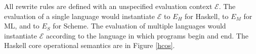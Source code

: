 

All rewrite rules are defined with an unspecified evaluation context $\mathscr{E}$.  The evaluation of a single language would instantiate $\mathscr{E}$ to $E_{H}$ for Haskell, to $E_{M}$ for ML, and to $E_{S}$ for Scheme.  The evaluation of multiple languages would instantiate $\mathscr{E}$ according to the language in which programs begin and end.  The Haskell core operational semantics are in Figure \ref{hcos}.



